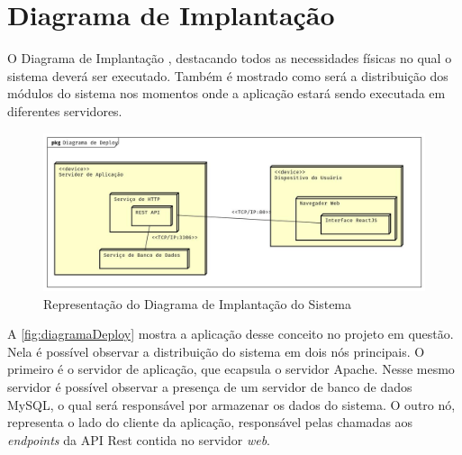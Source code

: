 \section{Diagrama de Implantação}
\label{sec:titSecDiagDeploy}

O Diagrama de Implantação \cite[determina as necessidades de \textit{hardware} do sistema, as características físicas como servidores, estações, topologias e protocolos de comunicação]{guedes2018uml}, destacando todos as necessidades físicas no qual o sistema deverá ser executado. Também é mostrado como será a distribuição dos módulos do sistema nos momentos onde a aplicação estará sendo executada em diferentes servidores.

\begin{figure}[H]
    \centering
    \includegraphics[width=13cm]{./dados/analise/diagramadeploy.jpg}
    \caption{Representação do Diagrama de Implantação do Sistema}
    \label{fig:diagramaDeploy}
\end{figure}

A \autoref{fig:diagramaDeploy} mostra a aplicação desse conceito no projeto em questão. Nela é possível observar a distribuição do sistema em dois nós principais. O primeiro é o servidor de aplicação, que ecapsula o servidor Apache. Nesse mesmo servidor é possível observar a presença de um servidor de banco de dados MySQL, o qual será responsável por armazenar os dados do sistema.
O outro nó, representa o lado do cliente da aplicação, responsável pelas chamadas aos \textit{endpoints} da API Rest contida no servidor \textit{web}.
